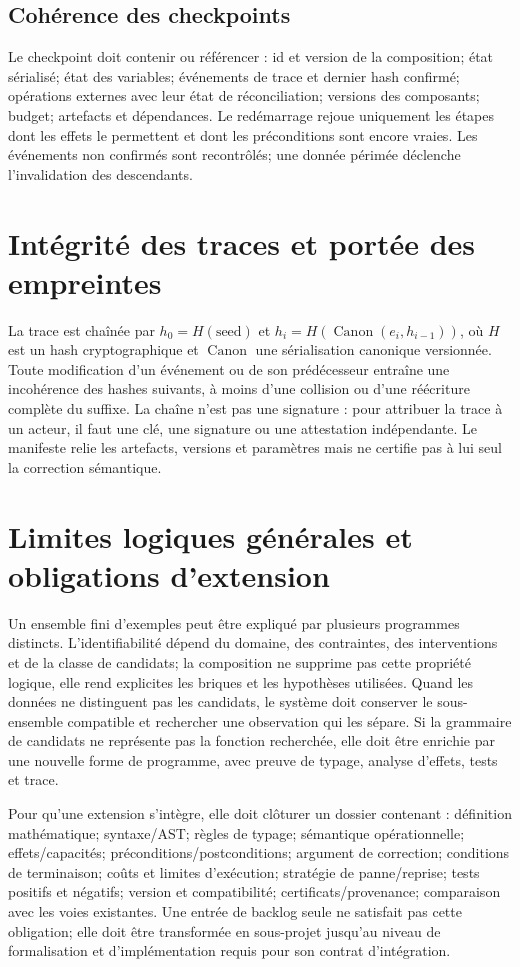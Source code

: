 \documentclass[11pt,a4paper]{article}
\theoremstyle{definition}
\theoremstyle{plain}
\theoremstyle{remark}
\begin{document}
\subsection{Cohérence des checkpoints}
Le checkpoint doit contenir ou référencer : id et version de la composition; état sérialisé; état des variables; événements de trace et dernier hash confirmé; opérations externes avec leur état de réconciliation; versions des composants; budget; artefacts et dépendances. Le redémarrage rejoue uniquement les étapes dont les effets le permettent et dont les préconditions sont encore vraies. Les événements non confirmés sont recontrôlés; une donnée périmée déclenche l'invalidation des descendants.

\section{Intégrité des traces et portée des empreintes}
La trace est chaînée par $h_0=H(\text{seed})$ et $h_i=H(\operatorname{Canon}(e_i,h_{i-1}))$, où $H$ est un hash cryptographique et $\operatorname{Canon}$ une sérialisation canonique versionnée. Toute modification d'un événement ou de son prédécesseur entraîne une incohérence des hashes suivants, à moins d'une collision ou d'une réécriture complète du suffixe. La chaîne n'est pas une signature : pour attribuer la trace à un acteur, il faut une clé, une signature ou une attestation indépendante. Le manifeste relie les artefacts, versions et paramètres mais ne certifie pas à lui seul la correction sémantique.

\section{Limites logiques générales et obligations d'extension}
Un ensemble fini d'exemples peut être expliqué par plusieurs programmes distincts. L'identifiabilité dépend du domaine, des contraintes, des interventions et de la classe de candidats; la composition ne supprime pas cette propriété logique, elle rend explicites les briques et les hypothèses utilisées. Quand les données ne distinguent pas les candidats, le système doit conserver le sous-ensemble compatible et rechercher une observation qui les sépare. Si la grammaire de candidats ne représente pas la fonction recherchée, elle doit être enrichie par une nouvelle forme de programme, avec preuve de typage, analyse d'effets, tests et trace.

Pour qu'une extension s'intègre, elle doit clôturer un dossier contenant : définition mathématique; syntaxe/AST; règles de typage; sémantique opérationnelle; effets/capacités; préconditions/postconditions; argument de correction; conditions de terminaison; coûts et limites d'exécution; stratégie de panne/reprise; tests positifs et négatifs; version et compatibilité; certificats/provenance; comparaison avec les voies existantes. Une entrée de backlog seule ne satisfait pas cette obligation; elle doit être transformée en sous-projet jusqu'au niveau de formalisation et d'implémentation requis pour son contrat d'intégration.
\end{document}
